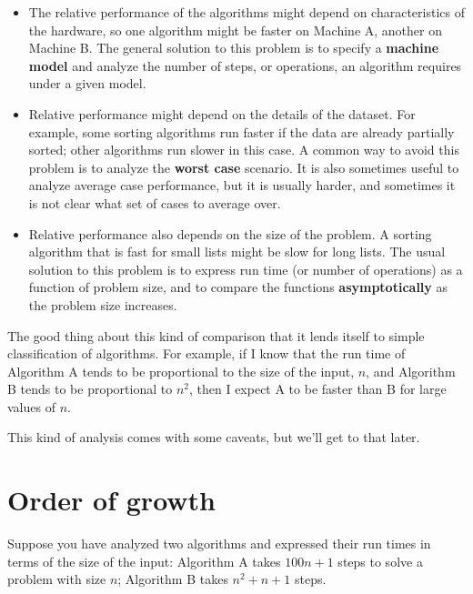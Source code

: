 \documentclass[12pt]{book}
\theoremstyle{exercise}
\begin{document}
\begin{itemize}

\item The relative performance of the algorithms might
depend on characteristics of the hardware, so one algorithm
might be faster on Machine A, another on Machine B.
The general solution to this problem is to specify a
{\bf machine model} and analyze the number of steps, or
operations, an algorithm requires under a given model.

\item Relative performance might depend on the details of
the dataset.  For example, some sorting
algorithms run faster if the data are already partially sorted;
other algorithms run slower in this case.
A common way to avoid this problem is to analyze the
{\bf worst case} scenario.  It is also sometimes useful to
analyze average case performance, but it is usually harder,
and sometimes it is not clear what set of cases to average over.

\item Relative performance also depends on the size of the
problem.  A sorting algorithm that is fast for small lists
might be slow for long lists.
The usual solution to this problem is to express run time
(or number of operations) as a function of problem size,
and to compare the functions {\bf asymptotically} as the problem
size increases.

\end{itemize}

The good thing about this kind of comparison that it lends
itself to simple classification of algorithms.  For example,
if I know that the run time of Algorithm A tends to be
proportional to the size of the input, $n$, and Algorithm B
tends to be proportional to $n^2$, then I
expect A to be faster than B for large values of $n$.

This kind of analysis comes with some caveats, but we'll get
to that later.


\section{Order of growth}

Suppose you have analyzed two algorithms and expressed
their run times in terms of the size of the input:
Algorithm A takes $100 n + 1$ steps to solve a problem with
size $n$; Algorithm B takes $n^2 + n + 1$ steps.
\end{document}
